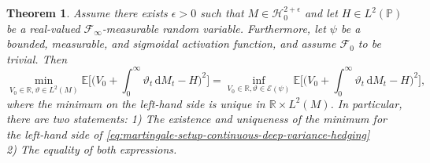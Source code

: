 \documentclass[11pt,a4paper,twoside,openany]{report}
\numberwithin{equation}{section}
\newcommand{\diff}{\mathrm{d}}
\theoremstyle{plain} %
\newtheorem{theorem}{Theorem}[section]
\theoremstyle{definition} %
\theoremstyle{remark} %
\begin{document}
\begin{theorem}\label{thm:martingale-setup-continuous-deep-variance-hedging}
Assume there exists \(\epsilon>0\) such that \(M\in\mathcal{H}_0^{2+\epsilon}\) and let \(H\in L^2(\mathbb{P})\) be a real-valued \(\mathcal{F}_{\infty}\)-measurable random variable. Furthermore, let \(\psi\) be a bounded, measurable, and sigmoidal activation function, and assume \(\mathcal{F}_0\) to be trivial. Then
\begin{equation}\label{eq:martingale-setup-continuous-deep-variance-hedging}
    \min_{V_0\in\mathbb{R},\vartheta\in L^2(M)}\mathbb{E}\bigg[\bigg(V_0+\int_{0}^{\infty}\vartheta_t\,\diff M_t-H\bigg)^2\bigg]
    =\inf_{V_0\in\mathbb{R},\vartheta\in\mathcal{E}(\psi)}\mathbb{E}\bigg[\bigg(V_0+\int_{0}^{\infty}\vartheta_t\,\diff M_t-H\bigg)^2\bigg],
\end{equation}
where the minimum on the left-hand side is unique in \(\mathbb{R}\times L^2(M)\). 
In particular, there are two statements: 1) The existence and uniqueness of the minimum for the left-hand side of \eqref{eq:martingale-setup-continuous-deep-variance-hedging}
\\2) The equality of both expressions. 
\end{theorem}
\end{document}
